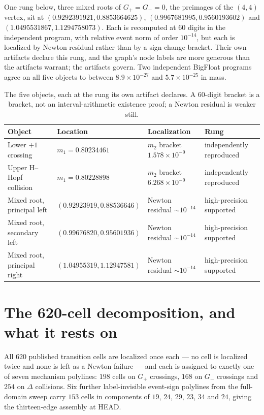 \documentclass[11pt]{article}
\begin{document}
One rung below, three mixed roots of $G_+=G_-=0$, the preimages of the $(4,4)$ vertex, sit at
$(0.9292391921,0.8853664625)$, $(0.9967681995,0.9560193602)$ and $(1.0495531867,1.1294758073)$. Each
is recomputed at $60$ digits in the independent program, with relative event norm of order
$10^{-14}$, but each is localized by Newton residual rather than by a sign-change bracket. Their own
artifacts declare this rung, and the graph's node labels are more generous than the artifacts
warrant; the artifacts govern. Two independent BigFloat programs agree on all five objects to
between $8.9\times10^{-27}$ and $5.7\times10^{-25}$ in mass.

\begin{table}[t]
\centering
\small
\begin{tabular}{llll}
\toprule
Object & Location & Localization & Rung \\
\midrule
Lower $+1$ crossing & $m_1=0.80234461$ & $m_2$ bracket $1.578\times10^{-9}$ & independently reproduced \\
Upper H--Hopf collision & $m_1=0.80228898$ & $m_2$ bracket $6.268\times10^{-9}$ & independently reproduced \\
Mixed root, principal left & $(0.92923919,0.88536646)$ & Newton residual $\sim10^{-14}$ & high-precision supported \\
Mixed root, secondary left & $(0.99676820,0.95601936)$ & Newton residual $\sim10^{-14}$ & high-precision supported \\
Mixed root, principal right & $(1.04955319,1.12947581)$ & Newton residual $\sim10^{-14}$ & high-precision supported \\
\bottomrule
\end{tabular}
\caption{The five objects, each at the rung its own artifact declares. A $60$-digit bracket is a
bracket, not an interval-arithmetic existence proof; a Newton residual is weaker still.}
\end{table}

\section{The 620-cell decomposition, and what it rests on}

All $620$ published transition cells are localized once each --- no cell is localized twice and none
is left as a Newton failure --- and each is assigned to exactly one of seven mechanism polylines:
$198$ cells on $G_+$ crossings, $168$ on $G_-$ crossings and $254$ on $\Delta$ collisions. Six
further label-invisible event-sign polylines from the full-domain sweep carry $153$ cells in
components of $19$, $24$, $29$, $23$, $34$ and $24$, giving the thirteen-edge assembly at HEAD.
\end{document}
